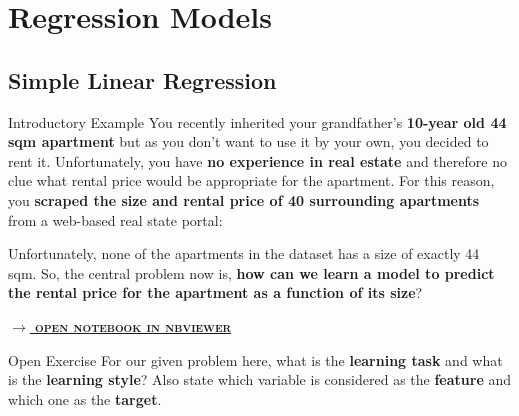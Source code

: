 \documentclass[document.tex]{subfiles}
\begin{document}
    \section{Regression Models}
    
    \subsection{Simple Linear Regression}

    \begin{frame}{Introductory Example}
        You recently inherited your grandfather's \textbf{10-year old 44 sqm apartment} but as you don't want to use it by your own, you decided to rent it. Unfortunately, you have \textbf{no experience in real estate} and therefore no clue what rental price would be appropriate for the apartment. For this reason, you \textbf{scraped the size and rental price of 40 surrounding apartments} from a web-based real state portal:
        
        \begin{table}
            \scalebox{0.8}{}
        \end{table}
        
        Unfortunately, none of the apartments in the dataset has a size of exactly 44 sqm. So, the central problem now is, \textbf{how can we learn a model to predict the rental price for the apartment as a function of its size}?

        \small{\href{https://nbviewer.jupyter.org/github/saschaschworm/big-data-and-data-science/blob/master/notebooks/demos/rental-prices-single-linear-regression.ipynb}{\textsc{\textbf{$\rightarrow$ open notebook in nbviewer}}}}
    \end{frame}

    \begin{frame}{Open Exercise }
        For our given problem here, what is the \textbf{learning task} and what is the \textbf{learning style}? Also state which variable is considered as the \textbf{feature} and which one as the \textbf{target}.
        
    \end{frame}
\end{document}

